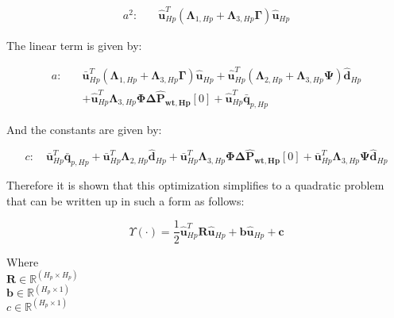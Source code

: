 \begin{equation}
  \begin{split}
    a^2  : \quad & \bm{\hat{u}}_{Hp}^{T}(\bm{\Lambda}_{1,Hp} + \bm{\Lambda}_{3,Hp} \bm{\Gamma} ) \bm{\hat{u}}_{Hp}
  \end{split}
\end{equation}

The linear term is given by: 

\begin{equation}
  \begin{split}
    a  : \quad & \bm{\bar{u}}_{Hp}^{T}(\bm{\Lambda}_{1,Hp} + \bm{\Lambda}_{3,Hp} \bm{\Gamma} ) \bm{\hat{u}}_{Hp} + \bm{\hat{u}}_{Hp}^{T}(\bm{\Lambda}_{2,Hp} + \bm{\Lambda}_{3,Hp} \bm{\Psi} ) \bm{\hat{d}}_{Hp}
    \\
    & + \bm{\hat{u}}_{Hp}^{T}\bm{\Lambda}_{3,Hp} \bm{\Phi} \bm{\Delta \hat{P}_{wt,Hp}}[0] + \bm{\hat{u}}_{Hp}^{T} \bm{\bar{q}}_{p,Hp}
  \end{split}
\end{equation}

And the constants are given by:

\begin{equation}
    c  : \quad \bm{\bar{u}}_{Hp}^{T}\bm{\bar{q}}_{p,Hp}  + \bm{\bar{u}}_{Hp}^{T}\bm{\Lambda}_{2,Hp}\bm{\hat{d}}_{Hp} + \bm{\bar{u}}_{Hp}^{T}\bm{\Lambda}_{3,Hp}\bm{\Phi} \bm{\Delta \hat{P}_{wt,Hp}}[0] + \bm{\bar{u}}_{Hp}^{T}\bm{\Lambda}_{3,Hp}\bm{\Psi}\bm{\hat{d}}_{Hp}
\end{equation}

Therefore it is shown that this optimization simplifies to a quadratic problem that can be written up in such a form as follows:

\begin{equation}
  \Upsilon(\cdot) =  \frac{1}{2} \bm{\hat{u}}_{Hp}^{T} \bm{R} \bm{\hat{u}}_{Hp} + \bm{b} \bm{\hat{u}}_{Hp} + \bm{c}
\end{equation}

\begin{minipage}[t]{0.28\textwidth}
Where\\
\hspace*{8mm} $\bm{R} \in \pmb{\mathbb{R}}^{(H_p \times H_p)} $ \\
\hspace*{8mm} $\bm{b} \in \pmb{\mathbb{R}}^{(H_p \times 1)} $ \\
\hspace*{8mm} $c \in \pmb{\mathbb{R}}^{(H_p \times 1)} $
\end{minipage}

